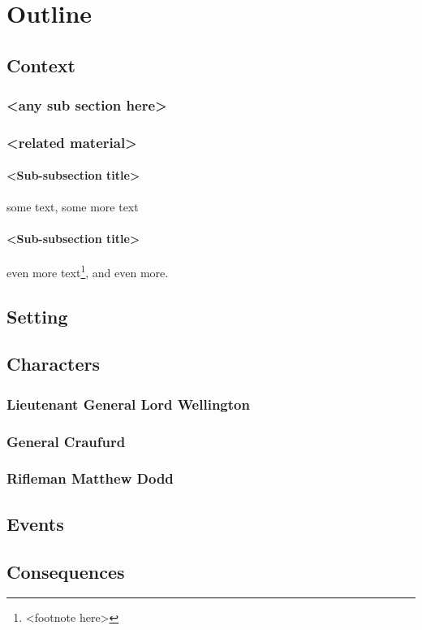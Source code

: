 \chapter{Outline}

\section{Context}
\subsection{<any sub section here>}

\subsection{<related material>}

\subsubsection{<Sub-subsection title>}
some text\cite{citation-1-name-here}, some more text

\subsubsection{<Sub-subsection title>}
even more text\footnote{<footnote here>}, and even more.

\section{Setting}

\section{Characters}
\subsection{Lieutenant General Lord Wellington}

\subsection{General Craufurd}

\subsection{Rifleman Matthew Dodd}


\section{Events}

\section{Consequences}

